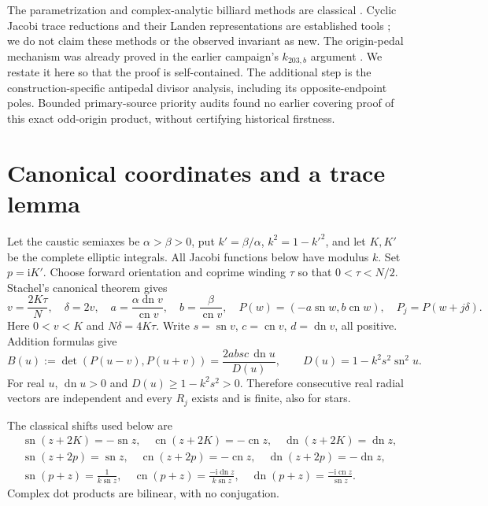 \documentclass[11pt,letterpaper]{article}
\DeclareMathOperator{\sn}{sn}
\DeclareMathOperator{\cn}{cn}
\DeclareMathOperator{\dn}{dn}
\newcommand{\ii}{\mathrm i}
\begin{document}
The parametrization and complex-analytic billiard methods are classical \cite{stachel,dlmf,ast}. Cyclic Jacobi
trace reductions and their Landen representations are established
tools \cite{cyclic,landen}; we do not claim these methods or the
observed invariant as new. The origin-pedal mechanism was already
proved in the earlier campaign's $k_{203,b}$ argument \cite{pedal}.
We restate it here so that the proof is self-contained. The additional
step is the construction-specific antipedal divisor analysis,
including its opposite-endpoint poles. Bounded primary-source
priority audits found no earlier covering proof of this exact
odd-origin product, without certifying historical firstness.

\section{Canonical coordinates and a trace lemma}
Let the caustic semiaxes be $\alpha>\beta>0$, put
$k'=\beta/\alpha$, $k^2=1-k'^2$, and let $K,K'$ be the complete
elliptic integrals. All Jacobi functions below have modulus $k$.
Set $p=\ii K'$. Choose forward orientation and coprime winding $\tau$
so that $0<\tau<N/2$. Stachel's canonical theorem
\cite[Theorem~4.3 and (4.9)]{stachel} gives
\begin{equation}\label{eq:param}
 v=\frac{2K\tau}{N},\quad \delta=2v,\quad
 a=\frac{\alpha\dn v}{\cn v},\quad b=\frac{\beta}{\cn v},
 \quad P(w)=(-a\sn w,b\cn w),\quad P_j=P(w+j\delta).
\end{equation}
Here $0<v<K$ and $N\delta=4K\tau$. Write
$s=\sn v$, $c=\cn v$, $d=\dn v$, all positive. Addition formulas give
\begin{equation}\label{eq:B}
 B(u):=\det(P(u-v),P(u+v))
 =\frac{2absc\,\dn u}{D(u)},\qquad
 D(u)=1-k^2s^2\sn^2u.
\end{equation}
For real $u$, $\dn u>0$ and $D(u)\geq1-k^2s^2>0$.
Therefore consecutive real radial vectors are independent and every
$R_j$ exists and is finite, also for stars.

The classical shifts used below are \cite[22.4 and 22.8]{dlmf}
\begin{align}
 &\sn(z+2K)=-\sn z,\quad \cn(z+2K)=-\cn z,\quad
 \dn(z+2K)=\dn z, \label{eq:realshift}\\
 &\sn(z+2p)=\sn z,\quad \cn(z+2p)=-\cn z,\quad
 \dn(z+2p)=-\dn z, \label{eq:imagshift}\\
 &\sn(p+z)=\frac1{k\sn z},\quad
 \cn(p+z)=\frac{-\ii\dn z}{k\sn z},\quad
 \dn(p+z)=\frac{-\ii\cn z}{\sn z}. \label{eq:pchart}
\end{align}
Complex dot products are bilinear, with no conjugation.
\end{document}
